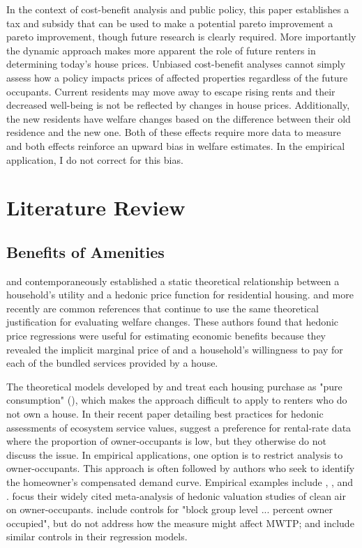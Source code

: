 \documentclass[ecta,nameyear,draft]{econsocart}
\theoremstyle{plain}
\theoremstyle{remark}
\begin{document}
In the context of cost-benefit analysis and public policy, this paper establishes a tax and subsidy that can be used to make a potential pareto improvement a pareto improvement, though future research is clearly required. More importantly the dynamic approach makes more apparent the role of future renters in determining today's house prices. Unbiased cost-benefit analyses cannot simply assess how a policy impacts prices of affected properties regardless of the future occupants. Current residents may move away to escape rising rents and their decreased well-being is not be reflected by changes in house prices. Additionally, the new residents have welfare changes based on the difference between their old residence and the new one. Both of these effects require more data to measure and both effects reinforce an upward bias in welfare estimates. In the empirical application, I do not correct for this bias.


\section{Literature Review}

\subsection{Benefits of Amenities}

\cite{rosen74} and \cite{freeman74} contemporaneously established a static theoretical relationship between a household's utility and a hedonic price function for residential housing. \cite{freeman99} and more recently \cite{freeman14} are common references that continue to use the same theoretical justification for evaluating welfare changes. These authors found that hedonic price regressions were useful for estimating economic benefits because they revealed the implicit marginal price of and a household's willingness to pay for each of the bundled services provided by a house. 

The theoretical models developed by \cite{rosen74} and \cite{freeman74} treat each housing purchase as "pure consumption" (\cite{rosen74}), which makes the approach difficult to apply to renters who do not own a house. In their recent paper detailing best practices for hedonic assessments of ecosystem service values, \cite{bishop20} suggest a preference for rental-rate data where the proportion of owner-occupants is low, but they otherwise do not discuss the issue. In empirical applications, one option is to restrict analysis to owner-occupants. This approach is often followed by authors who seek to identify the homeowner's compensated demand curve. Empirical examples include \cite{palmquist84}, \cite{zabelkiel00}, and \cite{chaygreenstone05}. \cite{smithhuang95} focus their widely cited meta-analysis of hedonic valuation studies of clean air on owner-occupants. \cite{kuminoffpope14} include controls for "block group level ... percent owner occupied", but do not address how the measure might affect MWTP; \cite{chaygreenstone05} and \cite{bento15} include similar controls in their regression models.
 
\end{document}
